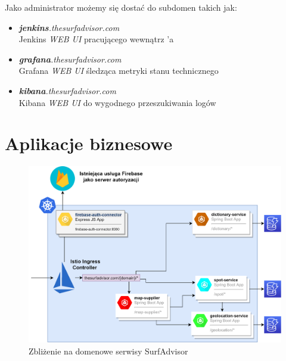 Jako administrator możemy się dostać do subdomen takich jak:

\begin{itemize}
    \item
    \emph{\textbf{jenkins}.thesurfadvisor.com}\\ 
    Jenkins \emph{WEB UI} pracującego wewnątrz 'a

    \item
    \emph{\textbf{grafana}.thesurfadvisor.com}\\
    Grafana \emph{WEB UI} śledząca metryki stanu technicznego

    \item
    \emph{\textbf{kibana}.thesurfadvisor.com}\\
    Kibana \emph{WEB UI} do wygodnego przeszukiwania logów
\end{itemize} 



\section{Aplikacje biznesowe}

\begin{figure}[!ht]
	\begin{center}
		\includegraphics[width=1\textwidth]{img/surf-services}
	\end{center}
    \caption{Zbliżenie na domenowe serwisy SurfAdvisor}
    \label{domain-services}
\end{figure}

